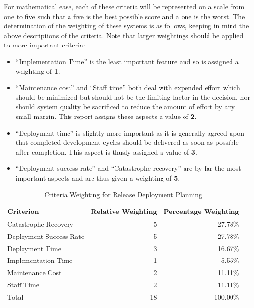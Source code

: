 \documentclass[12pt]{article}
\begin{document}
For mathematical ease, each of these criteria will be represented on a scale from one to five such that a five is the best possible score and a one is the worst. The determination of the weighting of these systems is as follows, keeping in mind the above descriptions of the criteria. Note that larger weightings should be applied to more important criteria:
\begin{itemize}
\item ``Implementation Time'' is the least important feature and so is assigned a weighting of {\bf 1}.
\item ``Maintenance cost'' and ``Staff time'' both deal with expended effort which should be minimized but should not be the limiting factor in the decision, nor should system quality be sacrificed to reduce the amount of effort by any small margin. This report assigns these aspects a value of {\bf 2}.
\item ``Deployment time'' is slightly more important as it is generally agreed upon that completed development cycles should be delivered as soon as possible after completion. This aspect is thusly assigned a value of {\bf 3}.
\item ``Deployment success rate'' and ``Catastrophe recovery'' are by far the most important aspects and are thus given a weighting of {\bf 5}.
\end{itemize}

\begin{table}[ht]
\caption{Criteria Weighting for Release Deployment Planning}
\label{tbl:weighting-rdp}
\centering
\begin{tabular}{|l|r|r|}
    \hline
    Criterion & Relative Weighting & Percentage Weighting \\
    \hline
    \hline
    Catastrophe Recovery    &  5 &  27.78\% \\
    Deployment Success Rate &  5 &  27.78\% \\
    Deployment Time         &  3 &  16.67\% \\
    Implementation Time     &  1 &   5.55\% \\
    Maintenance Cost        &  2 &  11.11\% \\
    Staff Time              &  2 &  11.11\% \\
    \hline
    \hline
    Total                   & 18 & 100.00\% \\
    \hline
\end{tabular}
\end{table}
\end{document}
